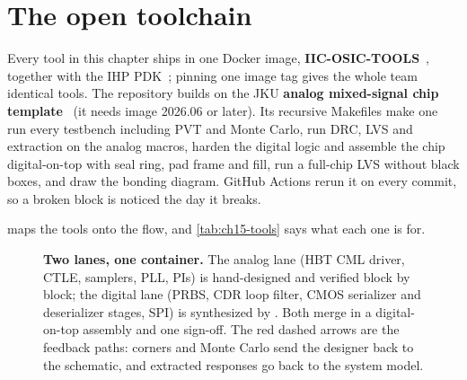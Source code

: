 \section{The open toolchain}\label{sec:toolchain}

Every tool in this chapter ships in one Docker image, \textbf{IIC-OSIC-TOOLS}~\cite{iicosic}, together with the IHP \sgx{} PDK~\cite{ihppdk}; pinning one image tag gives the whole team identical tools. The \OS{} repository builds on the JKU \textbf{analog mixed-signal chip template}~\cite{jkutemplate} (it needs image 2026.06 or later). Its recursive Makefiles make one  run every testbench including PVT and Monte Carlo, run DRC, LVS and extraction on the analog macros, harden the digital logic and assemble the chip digital-on-top with seal ring, pad frame and fill, run a full-chip LVS without black boxes, and draw the bonding diagram. GitHub Actions rerun it on every commit, so a broken block is noticed the day it breaks.

 maps the tools onto the flow, and \cref{tab:ch15-tools} says what each one is for.

\begin{figure}[!tbp]
\centering

\caption{\textbf{Two lanes, one container.} The analog lane (HBT CML driver, CTLE, samplers, PLL, PIs) is hand-designed and verified block by block; the digital lane (PRBS, CDR loop filter, CMOS serializer and deserializer stages, SPI) is synthesized by . Both merge in a digital-on-top assembly and one sign-off. The red dashed arrows are the feedback paths: corners and Monte Carlo send the designer back to the schematic, and extracted responses go back to the system model.}
\label{fig:ch15-tools}
\end{figure}

